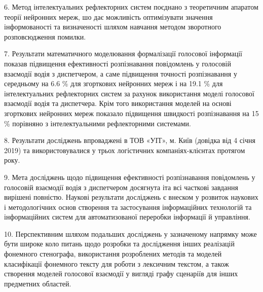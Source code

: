 6. Метод інтелектуальних рефлекторних систем поєднано з теоретичним апаратом теорії нейронних мереж, шо дає можливість оптимізувати значення інформованості та визначеності шляхом навчання методом зворотного розповсюдження помилки.

7. Результати математичного моделювання формалізації голосової інформації показав підвищення ефективності розпізнавання повідомлень у голосовій взаємодії водія з диспетчером, а саме підвищення точності розпізнавання у середньому на 6.6 \% для згорткових нейронних мереж і на 19.1 \% для інтелектуальних рефлекторних систем за рахунок використання моделі голосової взаємодії водія та диспетчера. Крім того використання моделей на основі згорткових нейронних мереж показало підвищення швидкості розпізнавання на 15 \% порівняно з інтелектуальними рефлекторними системами.

8. Результати досліджень впроваджені в ТОВ «УІТ», м. Київ (довідка від 4 січня 2019) та використовувалися у трьох логістичних компаніях-клієнтах протягом року.

9. Мета досліджень щодо підвищення ефективності розпізнавання повідомлень у голосовій взаємодії водія з диспетчером досягнута іта всі часткові завдання вирішені повністю. Наукові результати досліджень є внеском у розвиток наукових і методологічних основ створення та застосування інформаційних технологій та інформаційних систем для автоматизованої переробки інформації й управління.

10. Перспективним шляхом подальших досліджень у зазначеному напрямку може бути широке коло питань щодо розробки та дослідження інших реалізацій фонемного стенографа, використання розроблених методів та моделей класифікації фонемного тексту для роботи з лексичним текстом, а також створення моделей голосової взаємодії у вигляді графу сценаріїв для інших предметних областей.
